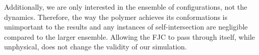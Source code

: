 \documentclass[../AdvancementSummary.tex]{subfiles}
\begin{document}
Additionally, we are only interested in the ensemble of configurations, not the dynamics. Therefore, the way the polymer achieves its conformations is unimportant to the results and any instances of self-intersection are negligible compared to the larger ensemble. Allowing the FJC to pass through itself, while unphysical, does not change the validity of our simulation.


%
%

%
%


\end{document}
